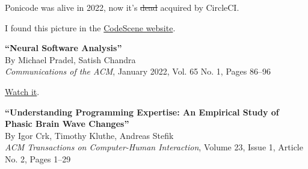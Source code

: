\documentclass{article}
\begin{document}
\plush{}


Ponicode was alive in 2022, now it's \st{dead} acquired by CircleCI.

\plush{}


\begin{multicols}{2}
\par\columnbreak\par
I found this picture in the \href{https://codescene.com/engineering-blog/refactoring-recommendations}{CodeScene website}.
\end{multicols}

\plush{}


\begin{multicols}{2}
\par\columnbreak\par
{}
\end{multicols}



\textbf{``Neural Software Analysis''} \\
By Michael Pradel, Satish Chandra \\
\emph{Communications of the ACM}, January 2022, Vol. 65 No. 1, Pages 86--96

\href{https://www.youtube.com/watch?v=Q0XJ5DoplRU}{Watch it}.

\plush{}


\textbf{``Understanding Programming Expertise: An Empirical Study of Phasic Brain Wave Changes''} \\
By Igor Crk, Timothy Kluthe, Andreas Stefik \\
\emph{ACM Transactions on Computer-Human Interaction}, Volume 23, Issue 1, Article No. 2, Pages 1--29

\plush{}


\plush{}
\end{document}
